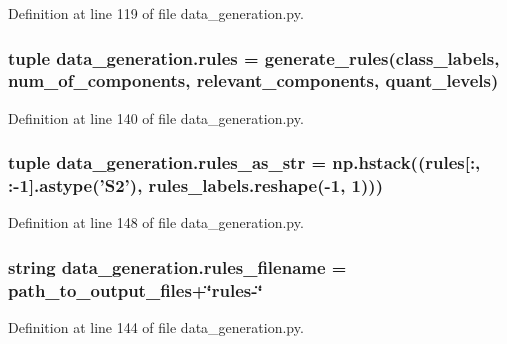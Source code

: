 Definition at line 119 of file data\+\_\+generation.\+py.

\hypertarget{namespacedata__generation_a18484efee600914bdb61f4082236d2ba}{
\subsubsection[{rules}]{\setlength{\rightskip}{0pt plus 5cm}tuple data\+\_\+generation.\+rules = {\bf generate\+\_\+rules}({\bf class\+\_\+labels}, {\bf num\+\_\+of\+\_\+components}, {\bf relevant\+\_\+components}, {\bf quant\+\_\+levels})}}\label{namespacedata__generation_a18484efee600914bdb61f4082236d2ba}


Definition at line 140 of file data\+\_\+generation.\+py.

\hypertarget{namespacedata__generation_a1e7ee3bfd1df183fdb922bbc4e93d12e}{
\subsubsection[{rules\+\_\+as\+\_\+str}]{\setlength{\rightskip}{0pt plus 5cm}tuple data\+\_\+generation.\+rules\+\_\+as\+\_\+str = np.\+hstack(({\bf rules}\mbox{[}\+:, \+:-\/1\mbox{]}.astype('S2'), rules\+\_\+labels.\+reshape(-\/1, 1)))}}\label{namespacedata__generation_a1e7ee3bfd1df183fdb922bbc4e93d12e}


Definition at line 148 of file data\+\_\+generation.\+py.

\hypertarget{namespacedata__generation_a2fd941c060f70244057a35a916a6a9d7}{
\subsubsection[{rules\+\_\+filename}]{\setlength{\rightskip}{0pt plus 5cm}string data\+\_\+generation.\+rules\+\_\+filename = {\bf path\+\_\+to\+\_\+output\+\_\+files}+\char`\"{}rules-\/\char`\"{}}}\label{namespacedata__generation_a2fd941c060f70244057a35a916a6a9d7}


Definition at line 144 of file data\+\_\+generation.\+py.

